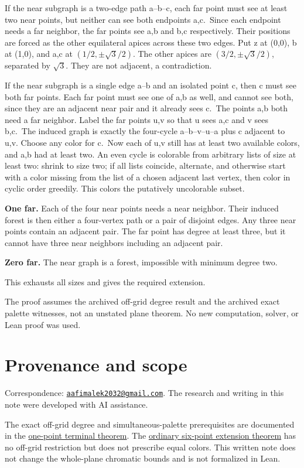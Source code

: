 \documentclass[
  11pt,
]{article}
\begin{document}
If the near subgraph is a two-edge path a--b--c, each far point must see
at least two near points, but neither can see both endpoints a,c.~Since
each endpoint needs a far neighbor, the far points see a,b and b,c
respectively. Their positions are forced as the other equilateral apices
across these two edges. Put z at (0,0), b at (1,0), and a,c at
\((1/2,\pm\sqrt{3}/2)\). The other apices are \((3/2,\pm\sqrt{3}/2)\),
separated by \(\sqrt{3}\). They are not adjacent, a contradiction.

If the near subgraph is a single edge a--b and an isolated point c, then
c must see both far points. Each far point must see one of a,b as well,
and cannot see both, since they are an adjacent near pair and it already
sees c.~The points a,b both need a far neighbor. Label the far points
u,v so that u sees a,c and v sees b,c.~The induced graph is exactly the
four-cycle a--b--v--u--a plus c adjacent to u,v. Choose any color for
c.~Now each of u,v still has at least two available colors, and a,b had
at least two. An even cycle is colorable from arbitrary lists of size at
least two: shrink to size two; if all lists coincide, alternate, and
otherwise start with a color missing from the list of a chosen adjacent
last vertex, then color in cyclic order greedily. This colors the
putatively uncolorable subset.

\textbf{One far.} Each of the four near points needs a near neighbor.
Their induced forest is then either a four-vertex path or a pair of
disjoint edges. Any three near points contain an adjacent pair. The far
point has degree at least three, but it cannot have three near neighbors
including an adjacent pair.

\textbf{Zero far.} The near graph is a forest, impossible with minimum
degree two.

This exhausts all sizes and gives the required extension.

The proof assumes the archived off-grid degree result and the archived
exact palette witnesses, not an unstated plane theorem. No new
computation, solver, or Lean proof was used.

\section{Provenance and scope}\label{provenance-and-scope}

Correspondence:
\href{mailto:aafimalek2032@gmail.com}{\nolinkurl{aafimalek2032@gmail.com}}.
The research and writing in this note were developed with AI assistance.

The exact off-grid degree and simultaneous-palette prerequisites are
documented in the
\href{https://github.com/Aafimalek/novel-discoveries/tree/487e4dfc1f1bcbd536a4d03c814db4d0d65da779/hadwiger-nelson/verification/g449/prime-seven-catalogue/one-point-distance2-terminals}{one-point
terminal theorem}. The
\href{https://github.com/Aafimalek/novel-discoveries/tree/294c4596476e933f75703479fab2ea0f87e3723e/hadwiger-nelson/verification/g449/prime-seven-catalogue/six-point-extension-theorem}{ordinary
six-point extension theorem} has no off-grid restriction but does not
prescribe equal colors. This written note does not change the
whole-plane chromatic bounds and is not formalized in Lean.
\end{document}
